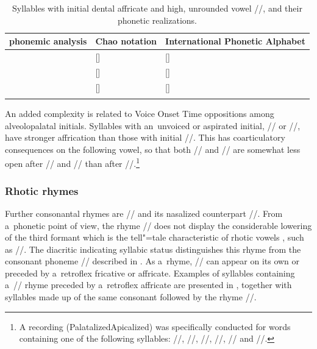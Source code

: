 	\begin{table}
		\caption{\label{tab:alveolopal}Syllables with initial dental affricate and high, unrounded vowel //, and their phonetic realizations.}
			\begin{tabularx}{\textwidth}{ P{30mm} l Q }
				\lsptoprule
				phonemic analysis & Chao notation & International Phonetic Alphabet\\\midrule
				 & [] & []\\
				 & [] & []\\
				 & [] & []\\
				\lspbottomrule
			\end{tabularx}
		\end{table}
		
	An added complexity is related to Voice Onset Time oppositions among alveolopalatal
	initials. Syllables with an~unvoiced or aspirated initial, // or //, have stronger
	affrication than those with initial //. This has {coarticulatory} consequences on the
	following vowel, so that both // and // are somewhat less open after // and
	// than after //.\footnote{A recording (PalatalizedApicalized) was specifically conducted for words containing one of the following syllables:
		//, //, //, //, // and //.}
		

	\subsubsection{Rhotic rhymes}
	\label{sec:rhoticrhymes}
	
	Further consonantal rhymes are // and its nasalized counterpart //. From a~phonetic
	point of view, the rhyme // does not display the considerable lowering of the third formant
	which is the tell"=tale characteristic of rhotic vowels \citep[313]{ladefogedetal1996}, such as 
	//. The diacritic indicating syllabic status distinguishes this rhyme from the consonant
	phoneme // described in . As a~rhyme,
	// can appear on its own or preceded by a~retroflex fricative or affricate. Examples of
	syllables containing a~// rhyme preceded by a~retroflex affricate are presented in
	,
	together with syllables made up of the same consonant followed by the rhyme //.
	

